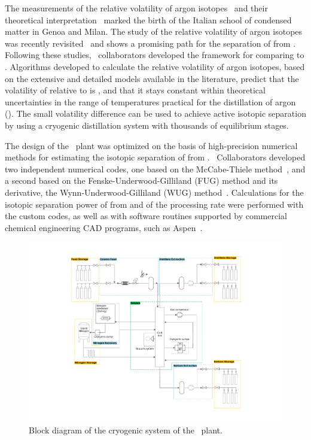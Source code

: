 The measurements of the relative volatility of argon isotopes~\cite{Boato:1962hg,Boato:1961hb,Boato:1959bn} and their theoretical interpretation~\cite{Casanova:1964gm,Casanova:1960dj,Fieschi:1961cd} marked the birth of the Italian school of condensed matter in Genoa and Milan.  The study of the relative volatility of argon isotopes was recently revisited~\cite{CanongiaLopes:2003ju,Calado:2000iq} and shows a promising path for the separation of  from .  Following these studies, \DS\ collaborators developed the framework for comparing  to .  Algorithms developed to calculate the relative volatility of argon isotopes, based on the extensive and detailed models available in the literature, predict that the volatility of  relative to  is \AriaArVolatiityRatio, and that it stays constant within theoretical uncertainties in the range of temperatures practical for the distillation of argon (\AriaArDistillationTemperatureRange).  The small volatility difference can be used to achieve active isotopic separation by using a cryogenic distillation system with thousands of equilibrium stages.

The design of the \Aria\ plant was optimized on the basis of high-precision numerical methods for estimating the isotopic separation of  from .  \DS\ Collaborators developed two independent numerical codes, one based on the McCabe-Thiele method~\cite{McCabe:1925be}, and a second based on the Fenske-Underwood-Gilliland (FUG) method and its derivative, the Wynn-Underwood-Gilliland (WUG) method~\cite{Underwood:1949dw,Gilliland:1940ja,Fenske:1932do}.  Calculations for the isotopic separation power of  from  and of the processing rate were performed with the custom codes, as well as with software routines supported by commercial chemical engineering CAD programs, such as Aspen~\cite{AspenTechnologyInc:2015ux}.

\begin{figure}[!t]
\centering
\includegraphics[width=\textwidth]{./Figures/Aria-Block-Diagram.pdf}
\caption[Block diagram of \Aria]{Block diagram of the cryogenic system of the \Aria\ plant.}
\label{fig:Aria-Block-Diagram}
\end{figure}


